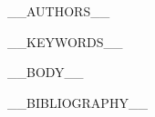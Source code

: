 \documentclass[journal,twoside]{IEEEtran}
\begin{document}
__AUTHORS__

\begin{abstract}
__ABSTRACT__
\end{abstract}

\begin{IEEEkeywords}
__KEYWORDS__
\end{IEEEkeywords}

__BODY__

__BIBLIOGRAPHY__
\end{document}
